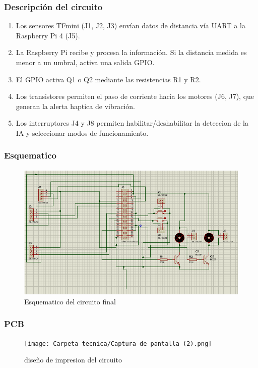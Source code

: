 \documentclass[12pt,a4paper]{article}
\begin{document}
\subsubsection{Descripción del circuito}
\begin{enumerate}
    \item Los sensores TFmini (J1, J2, J3) envían datos de distancia vía UART a la Raspberry Pi 4 (J5).
    \item La Raspberry Pi recibe y procesa la información. Si la distancia medida es menor a un umbral, activa una salida GPIO.
    \item El GPIO activa Q1 o Q2 mediante las resistencias R1 y R2.
    \item Los transistores permiten el paso de corriente hacia los motores (J6, J7), que generan la alerta haptica de vibración.
    \item Los interruptores J4 y J8 permiten habilitar/deshabilitar la deteccion de la IA y seleccionar modos de funcionamiento.
\end{enumerate}

\subsubsection{Esquematico}

\begin{figure}[H]
    \centering
\includegraphics[width=0.8\linewidth]{Carpeta tecnica/Captura de pantalla (1).png}
\caption{Esquematico del circuito final}
\end{figure}


\subsubsection{PCB}

\begin{figure}[H]
    \centering
\texttt{[image: Carpeta tecnica/Captura de pantalla (2).png]}
\caption{diseño de impresion del circuito}
\end{figure}
\end{document}
